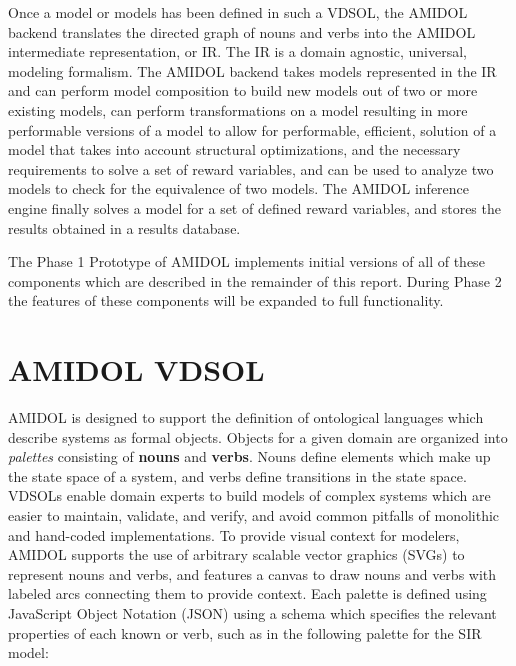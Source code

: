 \documentclass[11pt]{article}
\newcommand{\amidol}{\textsc{AMIDOL}}
\begin{document}
Once a model or models has been defined in such a VDSOL, the \amidol{} backend translates the directed graph of nouns and verbs into the \amidol{} intermediate representation, or IR.  The IR is a domain agnostic, universal, modeling formalism.  The \amidol{} backend takes models represented in the IR and can perform model composition to build new models out of two or more existing models, can perform transformations on a model resulting in more performable versions of a model to allow for performable, efficient, solution of a model that takes into account structural optimizations, and the necessary requirements to solve a set of reward variables, and can be used to analyze two models to check for the equivalence of two models. The \amidol{} inference engine finally solves a model for a set of defined reward variables, and stores the results obtained in a results database.

The Phase 1 Prototype of \amidol{} implements initial versions of all of these components which are described in the remainder of this report.  During Phase 2 the features of these components will be expanded to full functionality.

\section{\amidol{} VDSOL}

\amidol{} is designed to support the definition of ontological languages which describe systems as formal objects.  Objects for a given domain are organized into \emph{palettes} consisting of \textbf{nouns} and \textbf{verbs}.  Nouns define elements which make up the state space of a system, and verbs define transitions in the state space.  VDSOLs enable domain experts to build models of complex systems which are easier to maintain, validate, and verify, and avoid common pitfalls of monolithic and hand-coded implementations.  To provide visual context for modelers, \amidol{} supports the use of arbitrary scalable vector graphics (SVGs) to represent nouns and verbs, and features a canvas to draw nouns and verbs with labeled arcs connecting them to provide context.  Each palette is defined using JavaScript Object Notation (JSON) using a schema which specifies the relevant properties of each known or verb, such as in the following palette for the SIR model:
\end{document}
